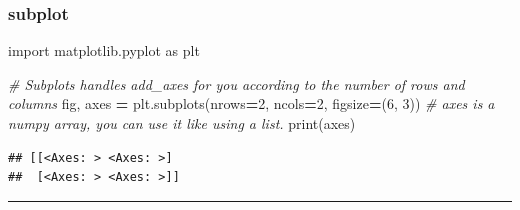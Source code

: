 \documentclass[
]{book}
\newenvironment{Shaded}{\begin{snugshade}}{\end{snugshade}}
\newcommand{\BuiltInTok}[1]{#1}
\newcommand{\CommentTok}[1]{\textcolor[rgb]{0.56,0.35,0.01}{\textit{#1}}}
\newcommand{\DecValTok}[1]{\textcolor[rgb]{0.00,0.00,0.81}{#1}}
\newcommand{\ImportTok}[1]{#1}
\newcommand{\NormalTok}[1]{#1}
\newcommand{\OperatorTok}[1]{\textcolor[rgb]{0.81,0.36,0.00}{\textbf{#1}}}
\theoremstyle{definition}
\theoremstyle{definition}
\theoremstyle{definition}
\theoremstyle{definition}
\theoremstyle{remark}
\begin{document}
\subsubsection{subplot}\label{subplot}

\begin{Shaded}
\begin{Highlighting}[]
\ImportTok{import}\NormalTok{ matplotlib.pyplot }\ImportTok{as}\NormalTok{ plt}

\CommentTok{\# Subplots handles add\_axes for you according to the number of rows and columns}
\NormalTok{fig, axes }\OperatorTok{=}\NormalTok{ plt.subplots(nrows}\OperatorTok{=}\DecValTok{2}\NormalTok{, ncols}\OperatorTok{=}\DecValTok{2}\NormalTok{, figsize}\OperatorTok{=}\NormalTok{(}\DecValTok{6}\NormalTok{, }\DecValTok{3}\NormalTok{))}
\CommentTok{\# axes is a numpy array, you can use it like using a list.}
\BuiltInTok{print}\NormalTok{(axes)}
\end{Highlighting}
\end{Shaded}

\begin{verbatim}
## [[<Axes: > <Axes: >]
##  [<Axes: > <Axes: >]]
\end{verbatim}

\begin{center}\rule{0.5\linewidth}{0.5pt}\end{center}
\end{document}
